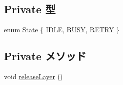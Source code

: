 \subsection*{Private 型}
\begin{DoxyCompactItemize}
\item 
enum \hyperlink{classBaseBus_1_1Layer_a5d74787dedbc4e11c1ab15bf487e61f8}{State} \{ \hyperlink{classBaseBus_1_1Layer_a5d74787dedbc4e11c1ab15bf487e61f8afd6a0e4343048b10646dd2976cc5ad18}{IDLE}, 
\hyperlink{classBaseBus_1_1Layer_a5d74787dedbc4e11c1ab15bf487e61f8aa6e504d57ec9777faa0185fbd3b93b97}{BUSY}, 
\hyperlink{classBaseBus_1_1Layer_a5d74787dedbc4e11c1ab15bf487e61f8a76d44342c42b85edbde0cae33f14c5de}{RETRY}
 \}
\end{DoxyCompactItemize}
\subsection*{Private メソッド}
\begin{DoxyCompactItemize}
\item 
void \hyperlink{classBaseBus_1_1Layer_a8f18de03b5e7510ac8a47a698bd673e3}{releaseLayer} ()
\end{DoxyCompactItemize}
